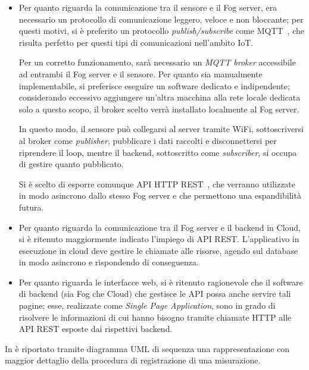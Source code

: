 \begin{itemize}
  \item
    Per quanto riguarda la comunicazione tra il sensore e il Fog server, era necessario un protocollo di comunicazione leggero, veloce e non bloccante;
    per questi motivi, si è preferito un protocollo \emph{publish/subscribe} come MQTT~\cite{ISOCS2016}, che risulta perfetto per questi tipi di comunicazioni nell'ambito IoT.

    Per un corretto funzionamento, sarà necessario un \emph{MQTT broker} accessibile ad entrambi il Fog server e il sensore.
    Per quanto sia manualmente implementabile, si preferisce eseguire un software dedicato e indipendente;
    considerando eccessivo aggiungere un'altra macchina alla rete locale dedicata solo a questo scopo, il broker scelto verrà installato localmente al Fog server.

    In questo modo, il sensore può collegarsi al server tramite WiFi, sottoscriversi al broker come \emph{publisher}, pubblicare i dati raccolti e disconnettersi per riprendere il loop,
    mentre il backend, sottoscritto come \emph{subscriber}, si occupa di gestire quanto pubblicato.

    Si è scelto di esporre comunque API HTTP REST~\cite{Fielding2000}, che verranno utilizzate in modo asincrono dallo stesso Fog server e che permettono una espandibilità futura.
  \item
    Per quanto riguarda la comunicazione tra il Fog server e il backend in Cloud, si è ritenuto maggiormente indicato l'impiego di API REST\@.
    L'applicativo in esecuzione in cloud deve gestire le chiamate alle risorse, agendo sul database in modo asincrono e rispondendo di conseguenza.
  \item
    Per quanto riguarda le interfacce web, si è ritenuto ragionevole che il software di backend (sia Fog che Cloud) che gestisce le API possa anche servire tali pagine;
    esse, realizzate come \emph{Single Page Application}, sono in grado di risolvere le informazioni di cui hanno bisogno tramite chiamate HTTP alle API REST esposte dai rispettivi backend.
\end{itemize}

In  è riportato tramite diagramma UML di sequenza una rappresentazione con maggior dettaglio della procedura di registrazione di una misurazione.


